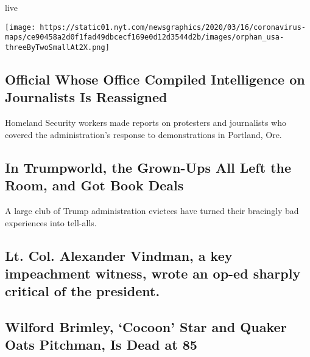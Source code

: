 live

\texttt{[image: https://static01.nyt.com/newsgraphics/2020/03/16/coronavirus-maps/ce90458a2d0f1fad49dbcecf169e0d12d3544d2b/images/orphan\_usa-threeByTwoSmallAt2X.png]}

\href{/2020/08/01/us/politics/brian-murphy-homeland-security-protesters.html}{}

\hypertarget{official-whose-office-compiled-intelligence-on-journalists-is-reassigned}{%
\subsection{Official Whose Office Compiled Intelligence on Journalists
Is
Reassigned}\label{official-whose-office-compiled-intelligence-on-journalists-is-reassigned}}

Homeland Security workers made reports on protesters and journalists who
covered the administration's response to demonstrations in Portland,
Ore.

\href{/2020/08/01/us/politics/trump-books.html}{}

\hypertarget{in-trumpworld-the-grown-ups-all-left-the-room-and-got-book-deals}{%
\subsection{In Trumpworld, the Grown-Ups All Left the Room, and Got Book
Deals}\label{in-trumpworld-the-grown-ups-all-left-the-room-and-got-book-deals}}

A large club of Trump administration evictees have turned their
bracingly bad experiences into tell-alls.

\href{/2020/08/01/us/politics/alexander-vindman-impeachment-trump.html}{}

\hypertarget{lt-col-alexander-vindman-a-key-impeachment-witness-wrote-an-op-ed-sharply-critical-of-the-president}{%
\subsection{Lt. Col. Alexander Vindman, a key impeachment witness, wrote
an op-ed sharply critical of the
president.}\label{lt-col-alexander-vindman-a-key-impeachment-witness-wrote-an-op-ed-sharply-critical-of-the-president}}

\href{/2020/08/01/obituaries/wilford-brimley-dead.html}{}

\hypertarget{wilford-brimley-cocoon-star-and-quaker-oats-pitchman-is-dead-at-85}{%
\subsection{Wilford Brimley, `Cocoon' Star and Quaker Oats Pitchman, Is
Dead at
85}\label{wilford-brimley-cocoon-star-and-quaker-oats-pitchman-is-dead-at-85}}

